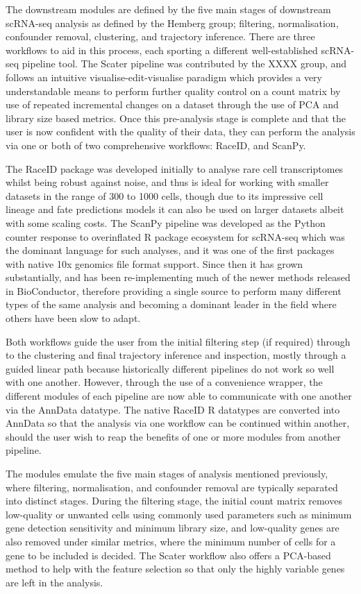 \documentclass[a4paper,num-refs]{oup-contemporary}
\begin{document}
The downstream modules are defined by the five main stages of downstream scRNA-seq analysis as defined by the Hemberg group; filtering, normalisation, confounder removal, clustering, and trajectory inference. There are three workflows to aid in this process, each sporting a different well-established scRNA-seq pipeline tool. The Scater pipeline was contributed by the XXXX group, and follows an intuitive visualise-edit-visualise paradigm which provides a very understandable means to perform further quality control on a count matrix by use of repeated incremental changes on a dataset through the use of PCA and library size based metrics. Once this pre-analysis stage is complete and that the user is now confident with the quality of their data, they can perform the analysis via one or both of two comprehensive workflows: RaceID, and ScanPy.

The RaceID package was developed initially to analyse rare cell transcriptomes whilst being robust against noise, and thus is ideal for working with smaller datasets in the range of 300 to 1000 cells, though due to its impressive cell lineage and fate predictions models it can also be used on larger datasets albeit with some scaling costs. The ScanPy pipeline was developed as the Python counter response to overinflated R package ecosystem for scRNA-seq which was the dominant language for such analyses, and it was one of the first packages with native 10x genomics file format support. Since then it has grown substantially, and has been re-implementing much of the newer methods released in BioConductor, therefore providing a single source to perform many different types of the same analysis and becoming a dominant leader in the field where others have been slow to adapt.

Both workflows guide the user from the initial filtering step (if required) through to the clustering and final trajectory inference and inspection, mostly through a guided linear path because historically different pipelines do not work so well with one another.
However, through the use of a convenience wrapper, the different modules of each pipeline are now able to communicate with one another via the AnnData datatype. The native RaceID R datatypes are converted into AnnData so that the analysis via one workflow can be continued within another, should the user wish to reap the benefits of one or more modules from another pipeline.

The modules emulate the five main stages of analysis mentioned previously, where filtering, normalisation, and confounder removal are typically separated into distinct stages. During the filtering stage, the initial count matrix removes low-quality or unwanted cells using commonly used parameters such as minimum gene detection sensitivity and minimum library size, and low-quality genes are also removed under similar metrics, where the minimum number of cells for a gene to be included is decided. The Scater workflow also offers a PCA-based method to help with the feature selection so that only the highly variable genes are left in the analysis.
\end{document}
